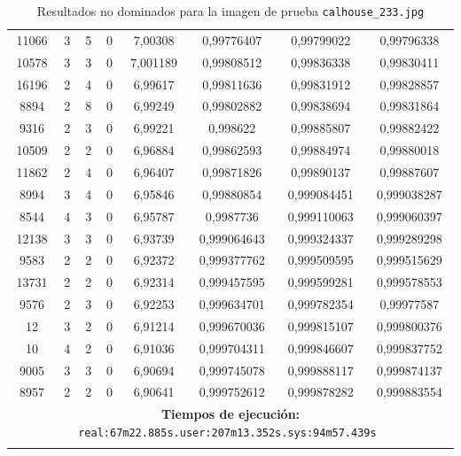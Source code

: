 \begin{longtable}{|c|c|c|c|c|c|c|c|}
11066 & 3 & 5 & 0 & 7,00308 & 0,99776407 & 0,99799022 & 0,99796338 \\
10578 & 3 & 3 & 0 & 7,001189 & 0,99808512 & 0,99836338 & 0,99830411 \\
16196 & 2 & 4 & 0 & 6,99617 & 0,99811636 & 0,99831912 & 0,99828857 \\
8894 & 2 & 8 & 0 & 6,99249 & 0,99802882 & 0,99838694 & 0,99831864 \\
9316 & 2 & 3 & 0 & 6,99221 & 0,998622 & 0,99885807 & 0,99882422 \\
10509 & 2 & 2 & 0 & 6,96884 & 0,99862593 & 0,99884974 & 0,99880018 \\
11862 & 2 & 4 & 0 & 6,96407 & 0,99871826 & 0,99890137 & 0,99887607 \\
8994 & 3 & 4 & 0 & 6,95846 & 0,99880854 & 0,999084451 & 0,999038287 \\
8544 & 4 & 3 & 0 & 6,95787 & 0,9987736 & 0,999110063 & 0,999060397 \\
12138 & 3 & 3 & 0 & 6,93739 & 0,999064643 & 0,999324337 & 0,999289298 \\
9583 & 2 & 2 & 0 & 6,92372 & 0,999377762 & 0,999509595 & 0,999515629 \\
13731 & 2 & 2 & 0 & 6,92314 & 0,999457595 & 0,999599281 & 0,999578553 \\
9576 & 2 & 3 & 0 & 6,92253 & 0,999634701 & 0,999782354 & 0,99977587 \\
12 & 3 & 2 & 0 & 6,91214 & 0,999670036 & 0,999815107 & 0,999800376 \\
10 & 4 & 2 & 0 & 6,91036 & 0,999704311 & 0,999846607 & 0,999837752 \\
9005 & 3 & 3 & 0 & 6,90694 & 0,999745078 & 0,999888117 & 0,999874137 \\
8957 & 2 & 2 & 0 & 6,90641 & 0,999752612 & 0,999878282 & 0,999883554 \\

\hline
\multicolumn{8}{|c|}{\textbf{Tiempos de ejecución:} \texttt{real:67m22.885s.user:207m13.352s.sys:94m57.439s
}}\\ \hline
\caption{Resultados no dominados para la imagen de prueba \texttt{calhouse\_233.jpg}}
\label{tab:calhouse_233}
\end{longtable}
\normalsize

